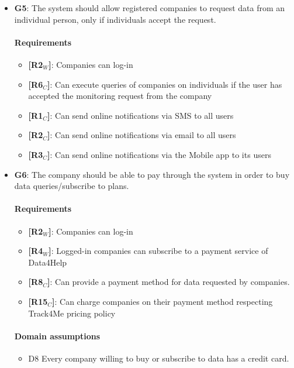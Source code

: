 \begin{itemize}
    \item \textbf{G5}: The system should allow registered companies to request data from an individual person, only if individuals accept the request.
    \paragraph{Requirements}
   \begin{itemize}
        \item \textbf{[R2$_W$]}: Companies can log-in
      \item \textbf{[R6$_C$]}: Can execute queries of companies on individuals if the user has accepted the monitoring request from the company
      \item \textbf{[R1$_C$]}: Can send online notifications via SMS to all users 
    \item \textbf{[R2$_C$]}: Can send online notifications via email to all users
    \item \textbf{[R3$_C$]}: Can send online notifications via the Mobile app to its users
   \end{itemize}
    
    \item \textbf{G6}: The company should be able to pay through the system in order to buy data queries/subscribe to plans.
    \paragraph{Requirements}
   \begin{itemize}
       \item \textbf{[R2$_W$]}: Companies can log-in
       \item \textbf{[R4$_W$]}: Logged-in companies can subscribe to a payment service of Data4Help
         \item \textbf{[R8$_C$]}: Can provide a payment method for data requested by companies.
       \item \textbf{[R15$_C$]}: Can charge companies on their payment method respecting Track4Me pricing policy
   \end{itemize}
   \paragraph{Domain assumptions}
   \begin{itemize}
       \item  D8  Every company willing to buy or subscribe to data has a credit card.
   \end{itemize}
   

\end{itemize}
